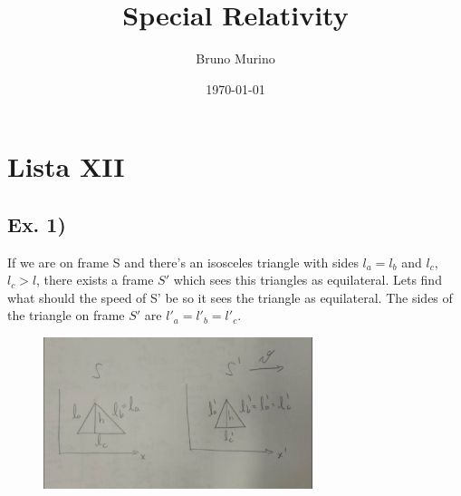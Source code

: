 \documentclass[oneside, 10pt, notitlepage]{book}
\title{Special Relativity} %
\author{Bruno Murino} %
\date{\today} %
\begin{document}
\chapter{Lista XII}

\section*{Ex. 1)}

If we are on frame S and there's an isosceles triangle with sides \(l_a = l_b\) and \(l_c\), \(l_c > l\), there exists a frame \(S'\) which sees this triangles as equilateral. Lets find what should the speed of S' be so it sees the triangle as equilateral. The sides of the triangle on frame \(S'\) are \(l'_a=l'_b=l'_c\).

\begin{figure}[H]
    \centering
    \includegraphics[width=0.7\textwidth]{L12_1}
    \label{fig:L12_1}
\end{figure}
\end{document}
